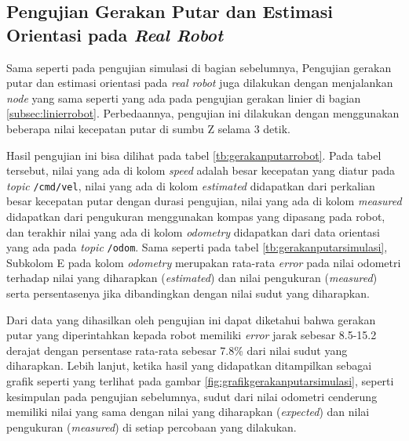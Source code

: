\subsection{Pengujian Gerakan Putar dan Estimasi Orientasi pada \emph{Real Robot}}
\label{subsec:putarrobot}

Sama seperti pada pengujian simulasi di bagian sebelumnya,
  Pengujian gerakan putar dan estimasi orientasi pada \emph{real robot} juga dilakukan dengan menjalankan \emph{node} yang sama seperti yang ada pada pengujian gerakan linier di bagian \ref{subsec:linierrobot}.
Perbedaannya, pengujian ini dilakukan dengan menggunakan beberapa nilai kecepatan putar di sumbu Z selama 3 detik.



Hasil pengujian ini bisa dilihat pada tabel \ref{tb:gerakanputarrobot}.
Pada tabel tersebut, nilai yang ada di kolom \emph{speed} adalah besar kecepatan yang diatur pada \emph{topic} \lstinline{/cmd/vel},
  nilai yang ada di kolom \emph{estimated} didapatkan dari perkalian besar kecepatan putar dengan durasi pengujian,
  nilai yang ada di kolom \emph{measured} didapatkan dari pengukuran menggunakan kompas yang dipasang pada robot,
  dan terakhir nilai yang ada di kolom \emph{odometry} didapatkan dari data orientasi yang ada pada \emph{topic} \lstinline{/odom}.
Sama seperti pada tabel \ref{tb:gerakanputarsimulasi},
  Subkolom E pada kolom \emph{odometry} merupakan rata-rata \emph{error} pada nilai odometri terhadap nilai yang diharapkan (\emph{estimated}) dan nilai pengukuran (\emph{measured}) serta persentasenya jika dibandingkan dengan nilai sudut yang diharapkan.

Dari data yang dihasilkan oleh pengujian ini dapat diketahui bahwa gerakan putar yang diperintahkan kepada robot memiliki \emph{error} jarak sebesar 8.5-15.2 derajat dengan persentase rata-rata sebesar 7.8\% dari nilai sudut yang diharapkan.
Lebih lanjut, ketika hasil yang didapatkan ditampilkan sebagai grafik seperti yang terlihat pada gambar \ref{fig:grafikgerakanputarsimulasi},
  seperti kesimpulan pada pengujian sebelumnya,
  sudut dari nilai odometri cenderung memiliki nilai yang sama dengan nilai yang diharapkan (\emph{expected}) dan nilai pengukuran (\emph{measured}) di setiap percobaan yang dilakukan.


